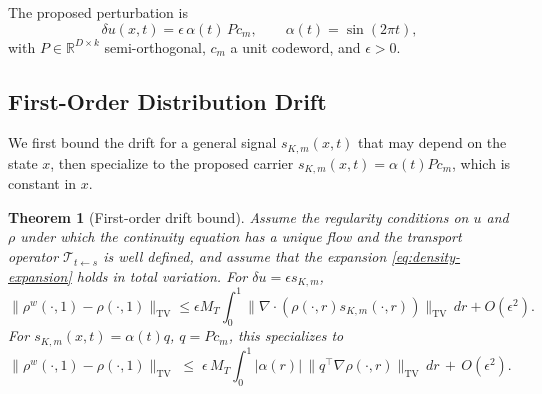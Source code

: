 \documentclass[11pt]{article}
\newtheorem{theorem}{Theorem}
\newcommand{\R}{\mathbb{R}}
\newcommand{\TV}{\mathrm{TV}}
\begin{document}
The proposed perturbation is
\begin{equation}
\delta u(x,t) = \epsilon\,\alpha(t)\,P c_m,
\qquad \alpha(t) = \sin(2\pi t),
\label{eq:proposed}
\end{equation}
with $P \in \R^{D \times k}$ semi-orthogonal, $c_m$ a unit codeword,
and $\epsilon > 0$.

\subsection{First-Order Distribution Drift}

We first bound the drift for a general signal $s_{K,m}(x,t)$ that may
depend on the state $x$, then specialize to the proposed carrier
$s_{K,m}(x,t) = \alpha(t) P c_m$, which is constant in $x$.

\begin{theorem}[First-order drift bound]
\label{thm:drift}
Assume the regularity conditions on $u$ and $\rho$ under which the
continuity equation has a unique flow and the transport operator
$\mathcal{T}_{t \leftarrow s}$ is well defined, and assume that the
expansion \eqref{eq:density-expansion} holds in total variation. For $\delta u=\epsilon s_{K,m}$,
\begin{equation}
\bigl\|\rho^w(\cdot,1)-\rho(\cdot,1)\bigr\|_{\TV}
\le \epsilon M_T\int_0^1
\bigl\|\nabla\!\cdot(\rho(\cdot,r)s_{K,m}(\cdot,r))\bigr\|_{\TV}\,dr
+O(\epsilon^2).
\label{eq:general-drift-bound}
\end{equation}
For $s_{K,m}(x,t)=\alpha(t)q$, $q=P c_m$, this specializes to
\begin{equation}
\bigl\|\rho^w(\cdot,1) - \rho(\cdot,1)\bigr\|_{\TV}
\;\le\;
\epsilon\,M_T
\int_0^1 |\alpha(r)|\,\|q^\top\nabla\rho(\cdot,r)\|_{\TV}\,dr
\,+\,O(\epsilon^2).
\label{eq:drift-bound}
\end{equation}
\end{theorem}
\end{document}
